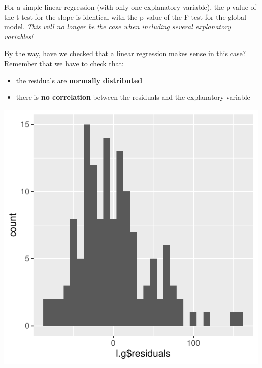 \documentclass[
]{book}
\newenvironment{Shaded}{\begin{snugshade}}{\end{snugshade}}
\newcommand{\AttributeTok}[1]{\textcolor[rgb]{0.13,0.29,0.53}{#1}}
\newcommand{\CommentTok}[1]{\textcolor[rgb]{0.56,0.35,0.01}{\textit{#1}}}
\newcommand{\FunctionTok}[1]{\textcolor[rgb]{0.13,0.29,0.53}{\textbf{#1}}}
\newcommand{\NormalTok}[1]{#1}
\newcommand{\SpecialCharTok}[1]{\textcolor[rgb]{0.81,0.36,0.00}{\textbf{#1}}}
\providecommand{\tightlist}{%
  \setlength{\itemsep}{0pt}\setlength{\parskip}{0pt}}
\begin{document}
For a simple linear regression (with only one explanatory variable), the p-value of the t-test for the slope is identical with the p-value of the F-test for the global model. \emph{This will no longer be the case when including several explanatory variables!}

By the way, have we checked that a linear regression makes sense in this case? Remember that we have to check that:

\begin{itemize}
\tightlist
\item
  the residuals are \textbf{normally distributed}
\item
  there is \textbf{no correlation} between the residuals and the explanatory variable
\end{itemize}

\begin{Shaded}
\end{Shaded}

\includegraphics{_main_files/figure-latex/unnamed-chunk-154-1.pdf}
\end{document}
